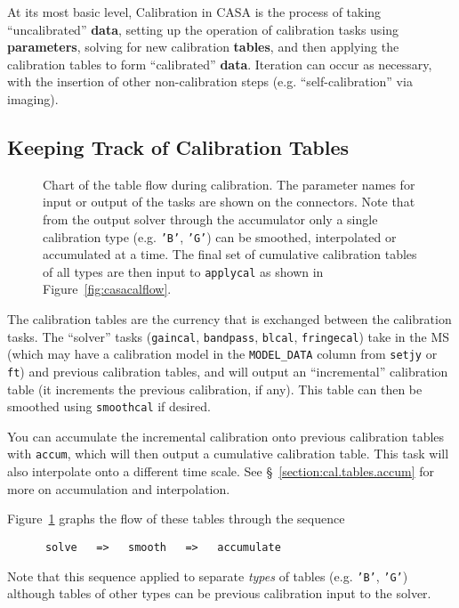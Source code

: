 At its most basic level, Calibration in CASA is the process of taking
``uncalibrated'' {\bf data}, setting up the operation of calibration
tasks using {\bf parameters}, solving for new calibration {\bf
tables}, and then applying the calibration tables to form 
``calibrated'' {\bf data}.  Iteration can occur as necessary, with
the insertion of other non-calibration steps
(e.g. ``self-calibration'' via imaging).

\subsection{Keeping Track of Calibration Tables}
\label{section:cal.flow.tables}

\begin{figure}[h!]
\begin{center}
\caption{\label{fig:casacaltables}
Chart of the table flow during calibration. The parameter names for
input or output of the tasks are shown on the connectors.  Note
that from the output solver through the accumulator only a single 
calibration type (e.g. {\tt 'B'}, {\tt 'G'}) can be smoothed,
interpolated or accumulated at a time.  The final set of
cumulative calibration tables of all types are then input to
{\tt applycal} as shown in Figure~\ref{fig:casacalflow}. }
\hrulefill
\end{center}
\end{figure}

The calibration tables are the currency that is exchanged between
the calibration tasks.  The ``solver'' tasks ({\tt gaincal},
{\tt bandpass}, {\tt blcal}, {\tt fringecal}) take in the MS
(which may have a calibration model in the {\tt MODEL\_DATA}
column from {\tt setjy} or {\tt ft}) and previous calibration
tables, and will output an ``incremental'' calibration table
(it increments the previous calibration, if any).  This table
can then be smoothed using {\tt smoothcal} if desired.

You can accumulate the incremental calibration onto previous
calibration tables with {\tt accum}, which will then output
a cumulative calibration table.
This task will also interpolate onto a different time scale.  
See \S~\ref{section:cal.tables.accum} for more on accumulation
and interpolation.

Figure~\ref{fig:casacaltables} graphs the flow of these tables
through the sequence
\small
\begin{verbatim}
      solve   =>   smooth   =>   accumulate
\end{verbatim}
\normalsize
Note that this sequence applied to separate {\em types} of tables
(e.g. {\tt 'B'}, {\tt 'G'}) although tables of other types can
be previous calibration input to the solver.

